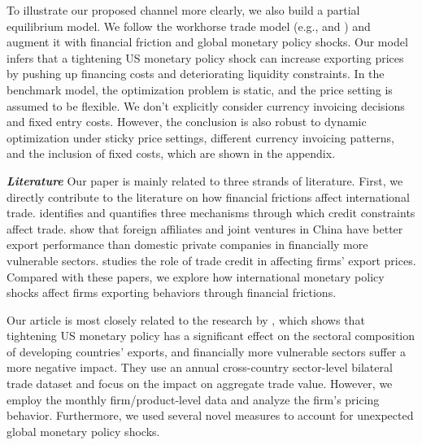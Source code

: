 To illustrate our proposed channel more clearly, we also build a partial equilibrium model. We follow the workhorse trade model (e.g., \cite{melitz2003impact} and \cite{manova2013credit}) and augment it with financial friction and global monetary policy shocks. Our model infers that a tightening US monetary policy shock can increase exporting prices by pushing up financing costs and deteriorating liquidity constraints. In the benchmark model, the optimization problem is static, and the price setting is assumed to be flexible. We don't explicitly consider currency invoicing decisions and fixed entry costs. However, the conclusion is also robust to dynamic optimization under sticky price settings, different currency invoicing patterns, and the inclusion of fixed costs, which are shown in the appendix.

\textbf{\textit{Literature}}
Our paper is mainly related to three strands of literature. First, we directly contribute to the literature on how financial frictions affect international trade. \cite{manova2013credit} identifies and quantifies three mechanisms through which credit constraints affect trade. \cite{manova2015firm} show that foreign affiliates and joint ventures in China have better export performance than domestic private companies in financially more vulnerable sectors. \cite{amberg2021trade} studies the role of trade credit in affecting firms’ export prices. Compared with these papers, we explore how international monetary policy shocks affect firms exporting behaviors through financial frictions. 

Our article is most closely related to the research by \cite{lin2018international}, which shows that tightening US monetary policy has a significant effect on the sectoral composition of developing countries' exports, and financially more vulnerable sectors suffer a more negative impact. They use an annual cross-country sector-level bilateral trade dataset and focus on the impact on aggregate trade value. However, we employ the monthly firm/product-level data and analyze the firm's pricing behavior. Furthermore, we used several novel measures to account for unexpected global monetary policy shocks. 


